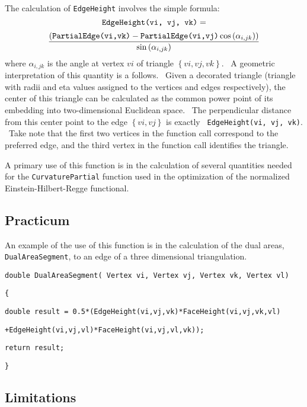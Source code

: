 The calculation of \texttt{EdgeHeight} involves the simple formula:%
\begin{equation*}
\text{\texttt{EdgeHeight(vi, vj, vk)}}=
\end{equation*}%
\begin{equation*}
\frac{\left( \text{\texttt{PartialEdge(vi,vk)}}-\text{\texttt{%
PartialEdge(vi,vj)}}\cos \left( \alpha _{i,jk}\right) \right) }{\sin \left(
\alpha _{i,jk}\right) }
\end{equation*}%
where $\alpha _{i,jk}$ is the angle at vertex $vi$ of triangle $\left\{
vi,vj,vk\right\} $. \ A geometric interpretation of this quantity is a
follows. \ Given a decorated triangle (triangle with radii and eta values
assigned to the vertices and edges respectively), the center of this
triangle can be calculated as the common power point of its embedding into
two-dimensional Euclidean space. \ The perpendicular distance from this
center point to the edge $\left\{ vi,vj\right\} $ is exactly \texttt{%
EdgeHeight(vi, vj, vk)}. \ Take note that the first two vertices in the
function call correspond to the preferred edge, and the third vertex in the
function call identifies the triangle. \ 

A primary use of this function is in the calculation of several quantities
needed for the \texttt{CurvaturePartial} function used in the optimization
of the normalized Einstein-Hilbert-Regge functional.

\subsection*{Practicum}

An example of the use of this function is in the calculation of the dual
areas, \texttt{DualAreaSegment}, to an edge of a three dimensional
triangulation.

\qquad \texttt{double DualAreaSegment( Vertex vi, Vertex vj, Vertex vk,
Vertex vl)}

\qquad\qquad\texttt{\{}

\qquad \qquad \texttt{double result =
0.5*(EdgeHeight(vi,vj,vk)*FaceHeight(vi,vj,vk,vl)}

\qquad \qquad \qquad \texttt{+EdgeHeight(vi,vj,vl)*FaceHeight(vi,vj,vl,vk));}

\qquad\qquad\texttt{return result;}

\qquad\qquad\texttt{\}}

\subsection*{Limitations}

